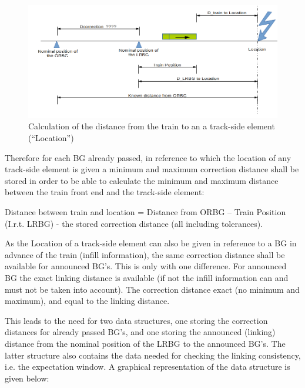 \begin{figure}[ht]
\centering
\includegraphics[scale=0.6]{../images/DataStructure_ReferenceSystem_CorrectionDistance.png}
\caption{Calculation of the distance from the train to an a track-side element (“Location”)}\label{fig:ReferenceSystemForCorrection}
\end{figure}

Therefore for each BG already passed, in reference to which the location of any track-side element is given a minimum and maximum correction distance shall be stored in order to be able to calculate the minimum and maximum distance between the train front end and the track-side element: 

Distance between train and location =
Distance from ORBG – Train Position (I.r.t. LRBG)  -  the stored correction distance (all including tolerances).


As the Location of a track-side element can also be given in reference to a BG in advance of the train (infill information), the same correction distance shall be available for announced BG's. This is only with one difference. For announced BG the exact linking distance is available (if not the infill information can and must not be taken into account). The correction distance exact (no minimum and maximum), and equal to the linking distance.

This leads to the need for two data structures, one storing the correction distances for already passed BG's, and one storing the announced (linking) distance from the nominal position of the LRBG to the announced BG's. The latter structure also contains the data needed for checking the linking consistency, i.e. the expectation window. A graphical representation of the data structure is given below: 

